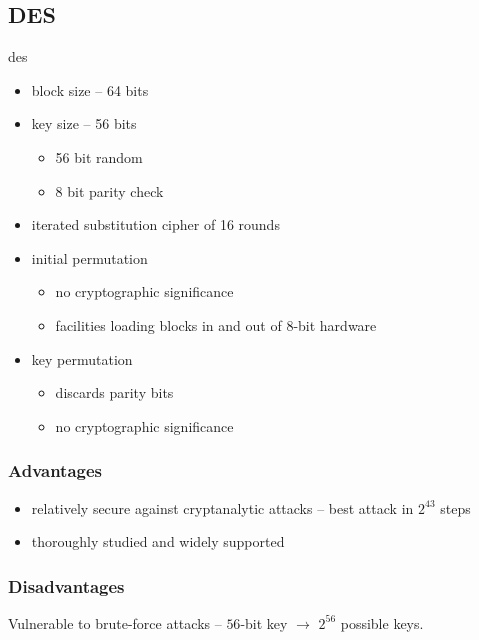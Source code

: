 \documentclass[draft]{article}
\begin{document}
\subsection{DES}
\acrfull{des}
\begin{itemize}[nosep]
    \item block size -- 64 bits
    \item key size -- 56 bits
          \begin{itemize}[nosep]
              \item 56 bit random
              \item 8 bit parity check
          \end{itemize}
    \item iterated substitution cipher of 16 rounds
    \item initial permutation
          \begin{itemize}[nosep]
              \item no cryptographic significance
              \item facilities loading blocks in and out of 8-bit hardware
          \end{itemize}
    \item key permutation
          \begin{itemize}[nosep]
              \item discards parity bits
              \item no cryptographic significance
          \end{itemize}
\end{itemize}
\subsubsection*{Advantages}
\begin{itemize}[nosep]
    \item relatively secure against cryptanalytic attacks -- best attack in $2^{43}$ steps
    \item thoroughly studied and widely supported
\end{itemize}
\subsubsection*{Disadvantages}
Vulnerable to \glspl{brute-force attack} -- $56$-bit key $\rightarrow$ $2^{56}$ possible keys.
\end{document}
